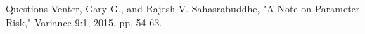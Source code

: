 \documentclass[10pt, xcolor=x11names,compress]{beamer}
\begin{document}
\begin{frame}{Questions}
	Venter, Gary G., and Rajesh V. Sahasrabuddhe, "A Note on Parameter Risk," Variance 9:1, 2015, pp. 54-63.
\end{frame}
\end{document}
